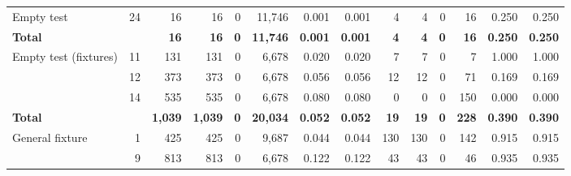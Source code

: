 \begin{xltabular}{\linewidth}{l r r r r r r r r r r r r r}
  \midrule
    \textcolor{muted}{Empty test} & \textcolor{muted}{24} & \textcolor{muted}{16} & \textcolor{muted}{16} & \textcolor{muted}{0} & \textcolor{muted}{11,746} & \textcolor{muted}{0.001} & \textcolor{muted}{0.001} & \textcolor{muted}{4} & \textcolor{muted}{4} & \textcolor{muted}{0} & \textcolor{muted}{16} & \textcolor{muted}{0.250} & \textcolor{muted}{0.250} \\
    \textbf{Total} & & \textbf{16} & \textbf{16} & \textbf{0} & \textbf{11,746} & \textbf{0.001} & \textbf{0.001} & \textbf{4} & \textbf{4} & \textbf{0} & \textbf{16} & \textbf{0.250} & \textbf{0.250} \\
  \midrule
    \textcolor{muted}{Empty test (fixtures)} & \textcolor{muted}{11} & \textcolor{muted}{131} & \textcolor{muted}{131} & \textcolor{muted}{0} & \textcolor{muted}{6,678} & \textcolor{muted}{0.020} & \textcolor{muted}{0.020} & \textcolor{muted}{7} & \textcolor{muted}{7} & \textcolor{muted}{0} & \textcolor{muted}{7} & \textcolor{muted}{1.000} & \textcolor{muted}{1.000} \\
     & \textcolor{muted}{12} & \textcolor{muted}{373} & \textcolor{muted}{373} & \textcolor{muted}{0} & \textcolor{muted}{6,678} & \textcolor{muted}{0.056} & \textcolor{muted}{0.056} & \textcolor{muted}{12} & \textcolor{muted}{12} & \textcolor{muted}{0} & \textcolor{muted}{71} & \textcolor{muted}{0.169} & \textcolor{muted}{0.169} \\
     & \textcolor{muted}{14} & \textcolor{muted}{535} & \textcolor{muted}{535} & \textcolor{muted}{0} & \textcolor{muted}{6,678} & \textcolor{muted}{0.080} & \textcolor{muted}{0.080} & \textcolor{muted}{0} & \textcolor{muted}{0} & \textcolor{muted}{0} & \textcolor{muted}{150} & \textcolor{muted}{0.000} & \textcolor{muted}{0.000} \\
    \textbf{Total} & & \textbf{1,039} & \textbf{1,039} & \textbf{0} & \textbf{20,034} & \textbf{0.052} & \textbf{0.052} & \textbf{19} & \textbf{19} & \textbf{0} & \textbf{228} & \textbf{0.390} & \textbf{0.390} \\
  \midrule
    \textcolor{muted}{General fixture} & \textcolor{muted}{1} & \textcolor{muted}{425} & \textcolor{muted}{425} & \textcolor{muted}{0} & \textcolor{muted}{9,687} & \textcolor{muted}{0.044} & \textcolor{muted}{0.044} & \textcolor{muted}{130} & \textcolor{muted}{130} & \textcolor{muted}{0} & \textcolor{muted}{142} & \textcolor{muted}{0.915} & \textcolor{muted}{0.915} \\
     & \textcolor{muted}{9} & \textcolor{muted}{813} & \textcolor{muted}{813} & \textcolor{muted}{0} & \textcolor{muted}{6,678} & \textcolor{muted}{0.122} & \textcolor{muted}{0.122} & \textcolor{muted}{43} & \textcolor{muted}{43} & \textcolor{muted}{0} & \textcolor{muted}{46} & \textcolor{muted}{0.935} & \textcolor{muted}{0.935} \\

\end{xltabular}
